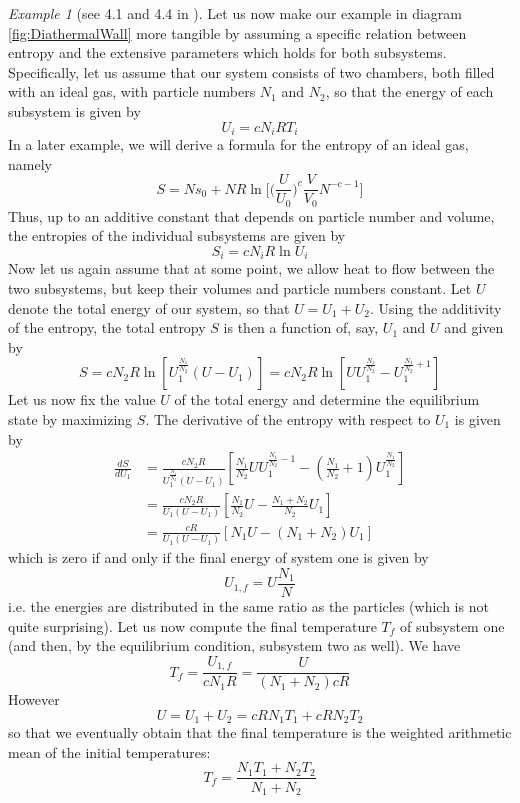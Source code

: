 \documentclass[a4paper, draft]{article}
\theoremstyle{own}
\theoremstyle{remark}
\newtheorem{example}{Example}[section]
\begin{document}
\begin{example}[see 4.1 and 4.4 in \cite{Callen}]\label{ex:idealgascomposite}
Let us now make our example in diagram \ref{fig:DiathermalWall} more tangible by assuming a specific relation between entropy and the extensive parameters which holds for both subsystems. Specifically, let us assume that our system consists of two chambers, both filled with an ideal gas, with particle numbers $N_1$ and $N_2$, so that the energy of each subsystem is given by
$$
U_i = c N_i R T_i
$$
In a later example, we will derive a formula for the entropy of an ideal gas, namely
$$
S =  N s_0 + N R \ln \big[ \big( \frac{U}{U_0} \big)^c \frac{V}{V_0} N^{-c - 1}  \big]
$$
Thus, up to an additive constant that depends on particle number and volume, the entropies of the individual subsystems are given by
$$
S_i =  c N_i R \ln U_i
$$
Now let us again assume that at some point, we allow heat to flow between the two subsystems, but keep their volumes and particle numbers constant. Let $U$ denote the total energy of our system, so that $U = U_1 + U_2$. 
Using the additivity of the entropy, the total entropy $S$ is then a function of, say, $U_1$ and $U$ and given by
$$
S = c N_2 R \ln [ U_1^\frac{N_1}{N_2} (U - U_1)  ] = c N_2 R \ln [ U U_1^\frac{N_1}{N_2} -  U_1^{\frac{N_1}{N_2} + 1} ]
$$
Let us now fix the value $U$ of the total energy and determine the equilibrium state by maximizing $S$. The derivative of the entropy with respect to $U_1$ is given by
\begin{align*}	
\frac{dS}{d U_1} &= \frac{cN_2 R}{U_1^\frac{N_1}{N_2} (U - U_1)} [ \frac{N_1}{N_2} U U_1^{\frac{N_1}{N_2} - 1}    -    (\frac{N_1}{N_2} + 1) U_1^\frac{N_1}{N_2}  ] \\
&= \frac{cN_2R}{U_1 (U - U_1)}[ \frac{N_1}{N_2} U     -   \frac{N_1 + N_2}{N_2}  U_1  ] \\
&= \frac{c R}{U_1 (U - U_1)} [ N_1 U  -   (N_1 + N_2)  U_1  ]
\end{align*}
which  is zero if and only if the final energy of system one is given by
$$
U_{1, f} = U \frac{N_1}{N}
$$
i.e. the energies are distributed in the same ratio as the particles (which is not quite surprising). Let us now compute the final temperature $T_f$ of subsystem one (and then, by the equilibrium condition, subsystem two as well). We have
$$
T_f = \frac{U_{1, f}}{c N_1 R} = \frac{U}{(N_1 + N_2) c R}
$$
However 
$$
U = U_1 + U_2 = c R N_1 T_1 + c R N_2 T_2
$$
so that we eventually obtain that the final temperature is the weighted arithmetic mean of the initial temperatures:
$$
T_f = \frac{N_1 T_1 + N_2 T_2}{N_1 + N_2}
$$
\end{example}
\end{document}
